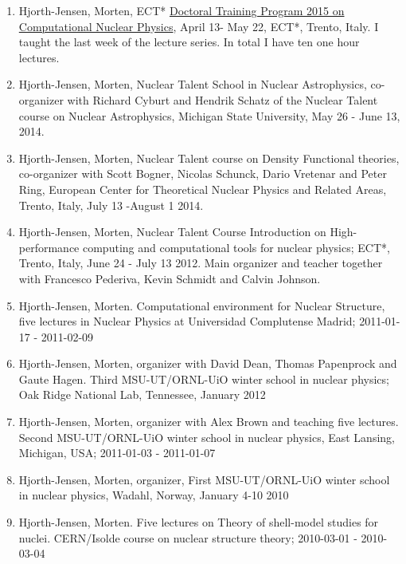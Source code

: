 \documentclass[a4wide,10pt]{article}
\begin{document}
\begin{enumerate}
\item Hjorth-Jensen, Morten, ECT* \href{{http://www.ectstar.eu/node/1287}}{Doctoral Training Program 2015 on Computational Nuclear Physics}, April 13- May 22, ECT*, Trento, Italy. I taught the last week of the lecture series. In total I have ten one hour lectures. 

\item Hjorth-Jensen, Morten, Nuclear Talent School in Nuclear Astrophysics, co-organizer with Richard Cyburt and Hendrik Schatz of the Nuclear Talent course on Nuclear Astrophysics,  Michigan State University, May 26 - June 13, 2014. 

\item Hjorth-Jensen, Morten, Nuclear Talent course on Density Functional theories, co-organizer with Scott Bogner, Nicolas Schunck, Dario Vretenar and Peter Ring, European Center for Theoretical Nuclear Physics and Related Areas, Trento, Italy, July 13 -August 1 2014.

\item Hjorth-Jensen, Morten, Nuclear Talent Course  Introduction on High-performance computing and computational tools for nuclear physics; ECT*, Trento, Italy, June 24 - July 13 2012. Main organizer and teacher together with Francesco Pederiva, Kevin Schmidt and Calvin Johnson. 

\item Hjorth-Jensen, Morten. Computational environment for Nuclear Structure, five lectures in Nuclear Physics at Universidad Complutense Madrid; 2011-01-17 - 2011-02-09

\item Hjorth-Jensen, Morten, organizer with David Dean, Thomas Papenprock and Gaute Hagen. Third MSU-UT/ORNL-UiO winter school in nuclear physics; Oak Ridge National Lab, Tennessee, January 2012

\item Hjorth-Jensen, Morten, organizer with Alex Brown and teaching five lectures. Second MSU-UT/ORNL-UiO winter school in nuclear physics, East Lansing, Michigan, USA; 2011-01-03 - 2011-01-07

\item Hjorth-Jensen, Morten, organizer, First MSU-UT/ORNL-UiO winter school in nuclear physics, Wadahl, Norway, January 4-10 2010

\item Hjorth-Jensen, Morten.  Five lectures on Theory of shell-model studies for nuclei. CERN/Isolde course on nuclear structure theory; 2010-03-01 - 2010-03-04


\end{enumerate}
\end{document}
